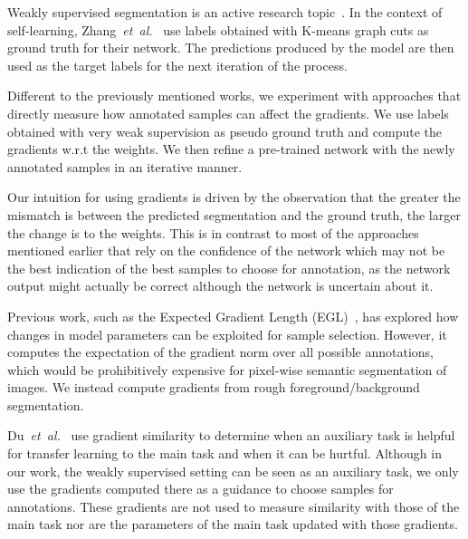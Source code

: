 \documentclass[letterpaper, 10 pt, conference]{ieeeconf}  %
\newcommand\etal{\emph{et~al.}}
\begin{document}
Weakly supervised segmentation is an active research topic~\cite{wei2018revisiting, acuna2018efficient, tang2018normalized, kwak2017weakly}. In the context of self-learning, Zhang~\etal~\cite{zhang2018self} use labels obtained with K-means graph cuts as ground truth for their network. The predictions produced by the model are then used as the target labels for the next iteration of the process.  

Different to the previously mentioned works, we experiment with approaches that directly measure how annotated samples can affect the gradients. We use labels obtained with very weak supervision as pseudo ground truth and compute the gradients w.r.t the weights. We then refine a pre-trained network with the newly annotated samples in an iterative manner. 

Our intuition for using gradients is driven by the observation that the greater the mismatch is between the predicted segmentation and the ground truth, the larger the change is to the weights. This is in contrast to most of the approaches mentioned earlier that rely on the confidence of the network which may not be the best indication of the best samples to choose for annotation, as the network output might actually be correct although the network is uncertain about it.

Previous work, such as the Expected Gradient Length (EGL)~\cite{huang2016active, settles2008multiple}, has explored how changes in model parameters can be exploited for sample selection. However, it computes the expectation of the gradient norm over all possible annotations, which would be prohibitively expensive for pixel-wise semantic segmentation of images. We instead compute gradients from rough foreground/background segmentation.

Du~\etal~\cite{du2018adapting} use gradient similarity to determine when an auxiliary task is helpful for transfer learning to the main task and when it can be hurtful. Although in our work, the weakly supervised setting can be seen as an auxiliary task, we only use the gradients computed there as a guidance to choose samples for annotations. These gradients are not used to measure similarity with those of the main task nor are the parameters of the main task updated with those gradients. 
\end{document}
